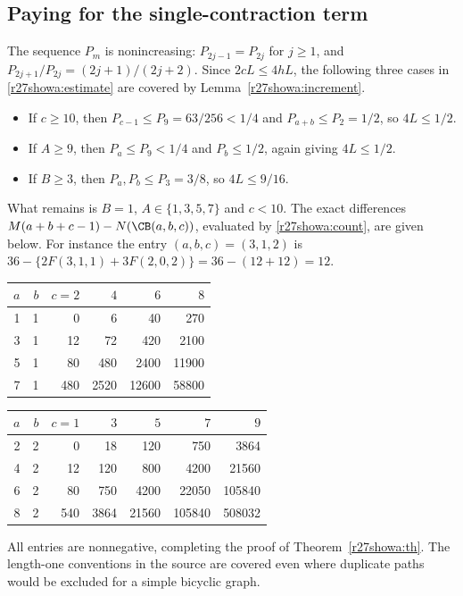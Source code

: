 \documentclass[11pt,a4paper]{article}
\numberwithin{equation}{section}
\theoremstyle{definition}
\theoremstyle{remark}
\begin{document}
\subsection{Paying for the single-contraction term}
The sequence $P_m$ is nonincreasing: $P_{2j-1}=P_{2j}$ for $j\ge1$,
and $P_{2j+1}/P_{2j}=(2j+1)/(2j+2)$.
Since $2cL\le4hL$, the following three cases in \eqref{r27showa:estimate} are
covered by Lemma~\ref{r27showa:increment}.
\begin{itemize}
\item If $c\ge10$, then $P_{c-1}\le P_9=63/256<1/4$ and
$P_{a+b}\le P_2=1/2$, so $4L\le1/2$.
\item If $A\ge9$, then $P_a\le P_9<1/4$ and $P_b\le1/2$, again giving
$4L\le1/2$.
\item If $B\ge3$, then $P_a,P_b\le P_3=3/8$, so $4L\le9/16$.
\end{itemize}
What remains is $B=1$, $A\in\{1,3,5,7\}$ and $c<10$. The exact
differences $M(a+b+c-1)-N(\CB(a,b,c))$, evaluated by \eqref{r27showa:count},
are given below. For instance the entry $(a,b,c)=(3,1,2)$ is
$36-\{2F(3,1,1)+3F(2,0,2)\}=36-(12+12)=12$.
\begin{center}\small
\begin{tabular}{rr|rrrr}
$a$&$b$&$c=2$&$4$&$6$&$8$\\\hline
1&1&0&6&40&270\\
3&1&12&72&420&2100\\
5&1&80&480&2400&11900\\
7&1&480&2520&12600&58800
\end{tabular}\par\medskip
\begin{tabular}{rr|rrrrr}
$a$&$b$&$c=1$&$3$&$5$&$7$&$9$\\\hline
2&2&0&18&120&750&3864\\
4&2&12&120&800&4200&21560\\
6&2&80&750&4200&22050&105840\\
8&2&540&3864&21560&105840&508032
\end{tabular}
\end{center}
All entries are nonnegative, completing the proof of Theorem~\ref{r27showa:th}.
The length-one conventions in the source are covered even where duplicate
paths would be excluded for a simple bicyclic graph.
\end{document}
